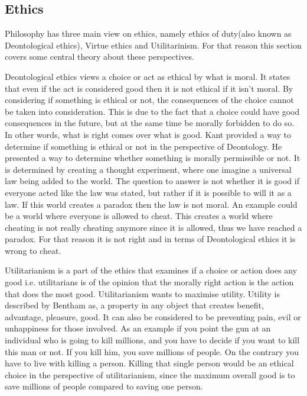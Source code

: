 \subsection{Ethics}
Philosophy has three main view on ethics, namely ethics of duty(also known as Deontological ethics), Virtue ethics and Utilitarinism. For that reason this section covers some central theory about these perspectives.

Deontological ethics views a choice or act as ethical by what is moral. It states that even if the act is considered good then it is not ethical if it isn't moral. By considering if something is ethical or not, the consequences of the choice cannot be taken into consideration. This is due to the fact that a choice could have good consequences in the future, but at the same time be morally forbidden to do so. In other words, what is right comes over what is good. 
Kant provided a way to determine if something is ethical or not in the perspective of Deontology. He presented a way to determine whether something is morally permissible or not. It is determined by creating a thought experiment, where one imagine a universal law being added to the world. The question to answer is not whether it is good if everyone acted like the law was stated, but rather if it is possible to will it as a law. If this world creates a paradox then the law is not moral. An example could be a world where everyone is allowed to cheat. This creates a world where cheating is not really cheating anymore since it is allowed, thus we have reached a paradox. For that reason it is not right and in terms of Deontological ethics it is wrong to cheat.

Utilitarianism is a part of the ethics that examines if a choice or action does any good i.e. utilitarians is of the opinion that the morally right action is the action that does the most good. Utilitarianism wants to maximise utility. Utility is described by Bentham as, a property in any object that creates benefit, advantage, pleasure, good. It can also be considered to be preventing pain, evil or unhappiness for those involved. As an example if you point the gun at an individual who is going to kill millions, and you have to decide if you want to kill this man or not. If you kill him, you save millions of people. On the contrary you have to live with killing a person. Killing that single person would be an ethical choice in the perspective of utilitarianism, since the maximum overall good is to save millions of people compared to saving one person. 

